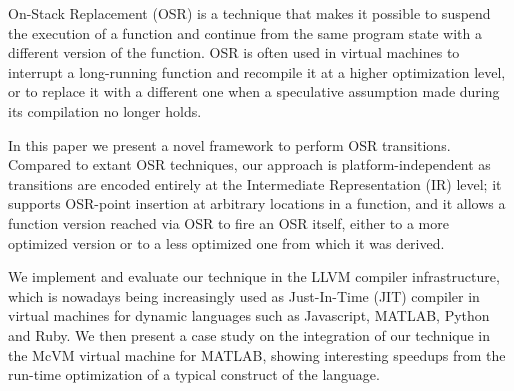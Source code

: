 On-Stack Replacement (OSR) is a technique that makes it possible to suspend the execution of a function and continue from the same program state with a different version of the function. OSR is often used in virtual machines to interrupt a long-running function and recompile it at a higher optimization level, or to replace it with a different one when a speculative assumption made during its compilation no longer holds.

In this paper we present a novel framework to perform OSR transitions. Compared to extant OSR techniques, our approach is platform-independent as transitions are encoded entirely at the Intermediate Representation (IR) level; it supports OSR-point insertion at arbitrary locations in a function, and it allows a function version reached via OSR to fire an OSR itself, either to a more optimized version or to a less optimized one from which it was derived.

We implement and evaluate our technique in the LLVM compiler infrastructure, which is nowadays being increasingly used as Just-In-Time (JIT) compiler in virtual machines for dynamic languages such as Javascript, MATLAB, Python and Ruby. We then present a case study on the integration of our technique in the McVM virtual machine for MATLAB, showing interesting speedups from the run-time optimization of a typical construct of the language.
  
  
  
  
  
  